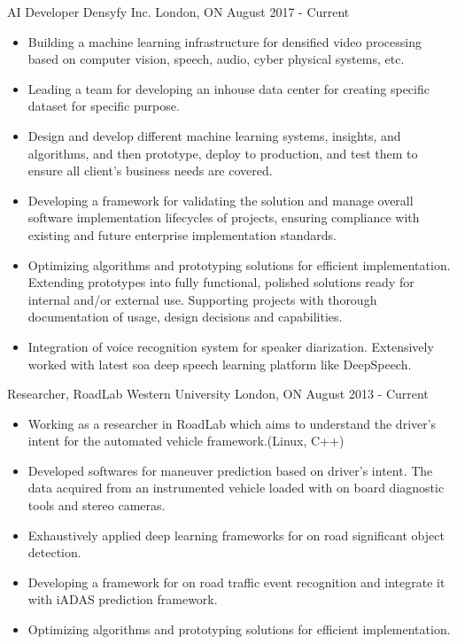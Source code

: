 \begin{cventries}
	\setlength{\itemsep}{1pt}
	\setlength{\parskip}{0pt}
	\setlength{\parsep}{0pt}
  \cventry
    {AI Developer}
    {Densyfy Inc.}
    {London, ON}
    {August 2017 - Current}
    {
	\begin{itemize}
		\item
		Building a machine learning infrastructure for densified video processing based on computer vision, speech, audio, cyber physical systems, etc.
		\item
		Leading a team for developing an inhouse data center for creating specific dataset for specific purpose.
		\item
		Design and develop different machine learning systems, insights, and algorithms, and then prototype, deploy to production, and test them to ensure all client’s business needs are covered.
		\item
		Developing a framework for validating the solution and manage overall software implementation lifecycles of projects, ensuring compliance with existing and future enterprise implementation standards.
		\item
		Optimizing algorithms and prototyping solutions for efficient implementation. Extending prototypes into fully functional, polished solutions ready for internal and/or external use. Supporting projects with thorough documentation of usage, design decisions and capabilities.
		\item
		Integration of voice recognition system for speaker diarization. Extensively worked with latest soa deep speech learning platform like DeepSpeech.		
	\end{itemize}
    }

  \cventry
  {Researcher, RoadLab}
  {Western University}
  {London, ON}
  {August 2013 - Current}
  {
  	\begin{itemize}
		\item
		Working as a researcher in RoadLab which aims to understand the driver's intent for the automated vehicle framework.(Linux, C++)
		\item
		Developed softwares for maneuver prediction based on driver's intent. The data acquired from an instrumented vehicle loaded with on board diagnostic tools and stereo cameras.
		\item
		Exhaustively applied deep learning frameworks for on road significant object detection.
		\item
		Developing a framework for on road traffic event recognition and integrate it with iADAS prediction framework.
		\item
		Optimizing algorithms and prototyping solutions for efficient implementation.	
	\end{itemize}
  }


\end{cventries}
